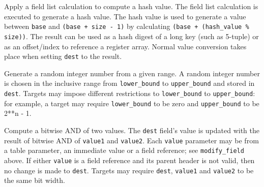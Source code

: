 \documentclass[12pt]{article}
\begin{document}

{ %
{Apply a field list calculation to compute a hash value.}
}
{ %
}
{ %
The field list calculation is executed to generate a hash value.  
The hash value is used to generate a value between \texttt{base} and 
\texttt{(base + size - 1)} by calculating \texttt{(base + (hash_value \% size))}. 
The result can be used as a hash digest of a long key (such as 5-tuple) or as 
an offset/index to reference a register array. Normal value conversion 
takes place when setting \texttt{dest} to the result.
}


{ %
Generate a random integer number from a given range.
}
{ %
}
{ %
A random integer number is chosen in the inclusive range from \texttt{lower_bound} to \texttt{upper_bound}
and stored in \texttt{dest}. 
Targets may impose different restrictions to \texttt{lower_bound} to \texttt{upper_bound}: 
for example, a target may require \texttt{lower_bound} 
to be zero and \texttt{upper_bound} to be 2**n - 1.
}


{ %
Compute a bitwise AND of two values.
}
{ %
}
{ %
The \texttt{dest} field's value is updated with the result of bitwise AND of
\texttt{value1} and \texttt{value2}. Each \texttt{value} parameter may be from a
table parameter, an immediate value or a field reference; see \texttt{modify_field} above. If either \texttt{value}
is a field reference and its parent header is not valid, then no
change is made to \texttt{dest}.
Targets may require \texttt{dest}, \texttt{value1} and \texttt{value2} to
be the same bit width.
}
\end{document}
